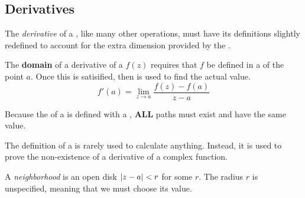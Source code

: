 \subsection{Derivatives}\label{subsec:Derivatives}
\begin{definition}[Derivative]\label{def:Complex_Derivative}
  The \emph{derivative} of a , like many other operations, must have its definitions slightly redefined to account for the extra dimension provided by the .

  The \textbf{domain} of a derivative of a  $f(z)$ requires that $f$ be defined in a  of the point $a$.
  Once this is satisified, then  is used to find the actual value.
  \begin{equation}\label{eq:Complex_Derivative}
    f'(a) = \lim\limits_{z \to a} \frac{f(z) - f(a)}{z - a}
  \end{equation}

  \begin{remark}\label{rmk:Complex_Derivative_Path_Existence}
    Because the  of a  is defined with a , \textbf{ALL} paths must exist and have the same value.
  \end{remark}

  \begin{remark}[Uses]\label{rmk:Complex_Derivative_Uses}
    The definition of a  is rarely used to calculate anything.
    Instead, it is used to prove the non-existence of a derivative of a complex function.
  \end{remark}
\end{definition}

\begin{definition}[Neighborhood]\label{def:Neighborhood}
  A \emph{neighborhood} is an open disk $\lvert z-a \rvert < r$ for some $r$.
  The radius $r$ is unspecified, meaning that we must choose its value.
\end{definition}

